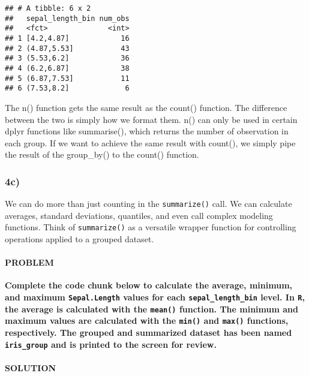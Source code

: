 \documentclass[]{article}
\newenvironment{Shaded}{\begin{snugshade}}{\end{snugshade}}
\newcommand{\DataTypeTok}[1]{\textcolor[rgb]{0.13,0.29,0.53}{#1}}
\newcommand{\KeywordTok}[1]{\textcolor[rgb]{0.13,0.29,0.53}{\textbf{#1}}}
\newcommand{\NormalTok}[1]{#1}
\newcommand{\OperatorTok}[1]{\textcolor[rgb]{0.81,0.36,0.00}{\textbf{#1}}}
\newcommand{\StringTok}[1]{\textcolor[rgb]{0.31,0.60,0.02}{#1}}
\let\oldparagraph\paragraph
\renewcommand{\paragraph}[1]{\oldparagraph{#1}\mbox{}}
\begin{document}
\begin{verbatim}
## # A tibble: 6 x 2
##   sepal_length_bin num_obs
##   <fct>              <int>
## 1 [4.2,4.87]            16
## 2 (4.87,5.53]           43
## 3 (5.53,6.2]            36
## 4 (6.2,6.87]            38
## 5 (6.87,7.53]           11
## 6 (7.53,8.2]             6
\end{verbatim}

The n() function gets the same result as the count() function. The
difference between the two is simply how we format them. n() can only be
used in certain dplyr functions like summarise(), which returns the
number of observation in each group. If we want to achieve the same
result with count(), we simply pipe the result of the group\_by() to the
count() function.

\hypertarget{c-3}{%
\subsubsection{4c)}\label{c-3}}

We can do more than just counting in the \texttt{summarize()} call. We
can calculate averages, standard deviations, quantiles, and even call
complex modeling functions. Think of \texttt{summarize()} as a versatile
wrapper function for controlling operations applied to a grouped
dataset.

\hypertarget{problem-20}{%
\paragraph{PROBLEM}\label{problem-20}}

\textbf{Complete the code chunk below to calculate the average, minimum,
and maximum \texttt{Sepal.Length} values for each
\texttt{sepal\_length\_bin} level. In \texttt{R}, the average is
calculated with the \texttt{mean()} function. The minimum and maximum
values are calculated with the \texttt{min()} and \texttt{max()}
functions, respectively. The grouped and summarized dataset has been
named \texttt{iris\_group} and is printed to the screen for review.}

\hypertarget{solution-19}{%
\paragraph{SOLUTION}\label{solution-19}}

\begin{Shaded}
\end{Shaded}
\end{document}
